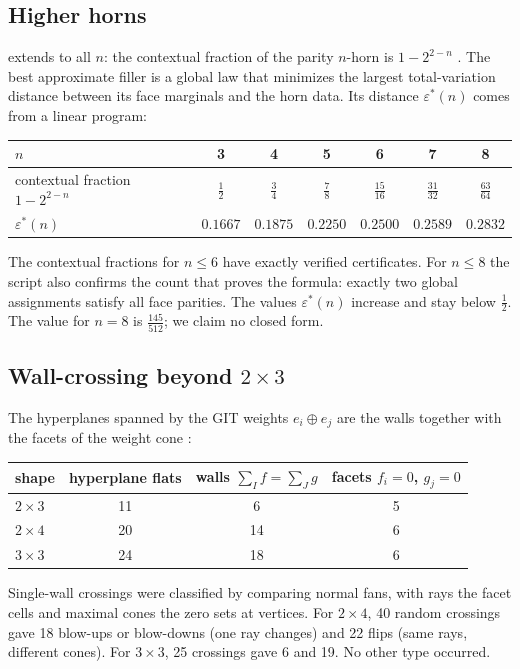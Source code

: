 \documentclass[11pt]{article}
\theoremstyle{definition}
\theoremstyle{remark}
\begin{document}
\subsection{Higher horns}\label{sec:openhorns}
 extends to all $n$: the contextual fraction of the parity $n$-horn is $1-2^{2-n}$ \cite[Thm.~4.3]{Conditionals}.
The best approximate filler is a global law that minimizes the largest total-variation distance between its face
marginals and the horn data. Its distance $\varepsilon^*(n)$ comes from a linear program:
\begin{center}\small
\begin{tabular}{@{}lcccccc@{}}
\toprule
$n$ & 3 & 4 & 5 & 6 & 7 & 8\\
\midrule
contextual fraction $1-2^{2-n}$ & $\tfrac12$ & $\tfrac34$ & $\tfrac78$ & $\tfrac{15}{16}$ & $\tfrac{31}{32}$ & $\tfrac{63}{64}$\\
$\varepsilon^*(n)$ & $0.1667$ & $0.1875$ & $0.2250$ & $0.2500$ & $0.2589$ & $0.2832$\\
\bottomrule
\end{tabular}
\end{center}
The contextual fractions for $n\le6$ have exactly verified certificates. For $n\le8$ the script also confirms the count
that proves the formula: exactly two global assignments satisfy all face parities. The values $\varepsilon^*(n)$
increase and stay below $\frac12$. The value for $n=8$ is $\frac{145}{512}$; we claim no closed form.

\subsection{Wall-crossing beyond $2\times3$}\label{sec:openvgit}
The hyperplanes spanned by the GIT weights $e_i\oplus e_j$ are the walls together with the facets of the weight cone
\cite[Prop.~10.5]{Conditionals}:
\begin{center}\small
\begin{tabular}{@{}lccc@{}}
\toprule
shape & hyperplane flats & walls $\sum_If=\sum_Jg$ & facets $f_i=0$, $g_j=0$\\
\midrule
$2\times3$ & 11 & 6 & 5\\
$2\times4$ & 20 & 14 & 6\\
$3\times3$ & 24 & 18 & 6\\
\bottomrule
\end{tabular}
\end{center}
Single-wall crossings were classified by comparing normal fans, with rays the facet cells and maximal cones the zero sets
at vertices. For $2\times4$, 40 random crossings gave 18 blow-ups or blow-downs (one ray changes) and 22 flips (same rays,
different cones). For $3\times3$, 25 crossings gave 6 and 19. No other type occurred.
\end{document}
